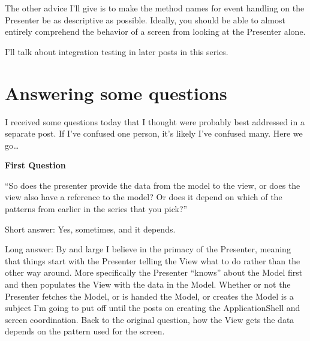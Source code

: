 \documentclass{article}
\begin{document}
{The other advice I'll give is to make the method names for event handling on the Presenter be as descriptive as possible.  Ideally, you should be able to almost entirely comprehend the behavior of a screen from looking at the Presenter alone.

I'll talk about integration testing in later posts in this series.

\section{ Answering some questions } 

I received some questions today that I thought were probably best addressed in a separate post.  If I've confused one person, it's likely I've confused many.  Here we go…

 
\Large {\textbf{First Question}}

    “So does the presenter provide the data from the model to the view, or does the view also have a reference to the model?  Or does it depend on which of the patterns from earlier in the series that you pick?”

Short answer:  Yes, sometimes, and it depends.  

Long answer:  By and large I believe in the primacy of the Presenter, meaning that things start with the Presenter telling the View what to do rather than the other way around.  More specifically the Presenter “knows” about the Model first and then populates the View with the data in the Model.  Whether or not the Presenter fetches the Model, or is handed the Model, or creates the Model is a subject I'm going to put off until the posts on creating the ApplicationShell and screen coordination.  Back to the original question, how the View gets the data depends on the pattern used for the screen.

}
\end{document}
